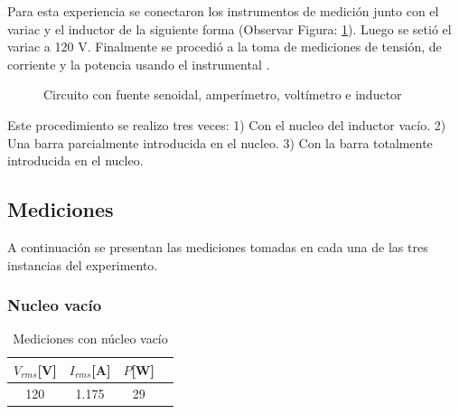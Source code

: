 \documentclass{article}
\begin{document}
        Para esta experiencia se conectaron los instrumentos de medición junto con el variac y el inductor de la siguiente forma (Observar Figura: \ref{fig:circuito-inductor}). Luego se setió el variac a 120 V. Finalmente se procedió a la toma de mediciones de tensión, de corriente y la potencia usando el instrumental . 
        \begin{figure}[h!]
            \centering
            \caption{Circuito con fuente senoidal, amperímetro, voltímetro e inductor}
            \label{fig:circuito-inductor}
        \end{figure}

        Este procedimiento se realizo tres veces: 1) Con el nucleo del inductor vacío. 2) Una barra parcialmente introducida en el nucleo. 3) Con la barra totalmente introducida en el nucleo.

    \subsection{Mediciones}
        
        A continuación se presentan las mediciones tomadas en cada una de las tres instancias del experimento.

        \subsubsection{Nucleo vacío}

        \begin{table}[H]
            \centering
            \begin{tabular}{|c|c|c|c|}
                \hline
                $V_{rms} $[V] & $I_{rms} $[A] & $P $[W]  \\ \hline
                120           & 1.175         & 29     \\ \hline
            \end{tabular}
            \caption{Mediciones con núcleo vacío}
            \label{tab:mediciones-nucleo-vacio}
        \end{table}
\end{document}
